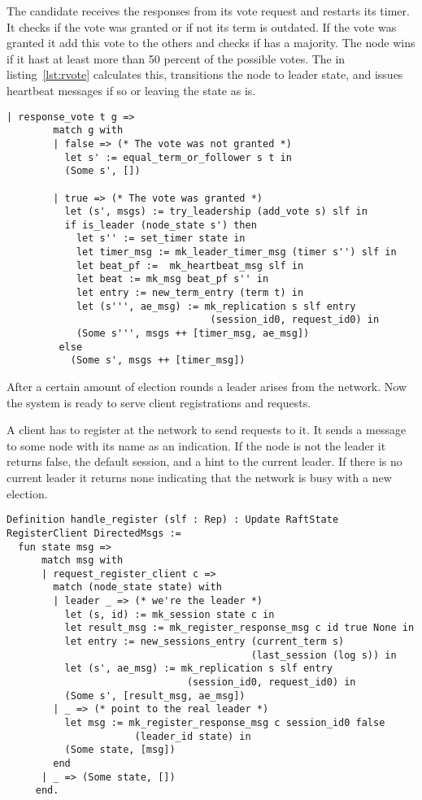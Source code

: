 The candidate receives the responses from its vote request and restarts its
timer. It checks if the vote was granted or if not its term is outdated.
If the vote was granted it add this vote to the others and checks if has a
majority. The node wins if it hast at least more than 50 percent of
the possible votes. The  in listing~\ref{lst:rvote}
calculates this, transitions the node to leader state, and
issues heartbeat messages if so or leaving the state as is.

\begin{lstlisting}[style=coq,label=lst:rvote,
caption=Handle a response to a vote request.]
      | response_vote t g =>
        match g with
        | false => (* The vote was not granted *)
          let s' := equal_term_or_follower s t in
          (Some s', [])

        | true => (* The vote was granted *)
          let (s', msgs) := try_leadership (add_vote s) slf in
          if is_leader (node_state s') then
            let s'' := set_timer state in
            let timer_msg := mk_leader_timer_msg (timer s'') slf in
            let beat_pf :=  mk_heartbeat_msg slf in
            let beat := mk_msg beat_pf s'' in
            let entry := new_term_entry (term t) in
            let (s''', ae_msg) := mk_replication s slf entry 
                                   (session_id0, request_id0) in
            (Some s''', msgs ++ [timer_msg, ae_msg])
         else
           (Some s', msgs ++ [timer_msg])
\end{lstlisting}

After a certain amount of election rounds a leader arises from the
network. Now the system is ready to serve client registrations and requests.

A client has to register at the network to send requests to it.
It sends a  message to some node with its
name as an indication. If the node is not the leader it returns
false, the default session, and a hint to the current leader.
If there is no current leader it returns none indicating that
the network is busy with a new election.

\begin{lstlisting}[style=coq,label=lst:register,
caption=The process of registering a client at the network.]
Definition handle_register (slf : Rep) : Update RaftState RegisterClient DirectedMsgs :=
  fun state msg =>
      match msg with
      | request_register_client c =>
        match (node_state state) with
        | leader _ => (* we're the leader *)
          let (s, id) := mk_session state c in
          let result_msg := mk_register_response_msg c id true None in
          let entry := new_sessions_entry (current_term s)
                                          (last_session (log s)) in
          let (s', ae_msg) := mk_replication s slf entry
                               (session_id0, request_id0) in
          (Some s', [result_msg, ae_msg])
        | _ => (* point to the real leader *)
          let msg := mk_register_response_msg c session_id0 false
                      (leader_id state) in
          (Some state, [msg])
        end
      | _ => (Some state, [])
     end.
\end{lstlisting}

